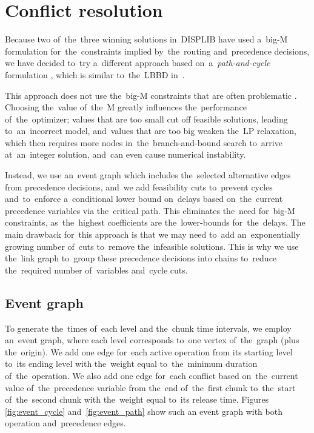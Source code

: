 \section{Conflict resolution}
Because two of~the~three winning solutions in~DISPLIB have used a~big-M formulation \cite{wolsey1998integer} for~the~constraints implied by~the~routing and~precedence decisions, we have decided to~try a~different approach based on~a~\emph{path-and-cycle} formulation \cite{lamorgese2019noncompact}\cite{lamorgese2015optimal}, which is similar to~the~LBBD in~\textcite{Dubach2025handling}.

This approach does not use the~big-M constraints that are often problematic \cite{pineda2019not}\cite{codato2006combinatorial}. Choosing the~value of~the~M greatly influences the~performance of~the~optimizer; values that are too small cut off feasible solutions, leading to~an~incorrect model, and~values that are too big weaken the~LP relaxation, which then requires more nodes in~the~branch-and-bound search to~arrive at~an~integer solution, and~can even cause numerical instability.

Instead, we use an~event graph which includes the~selected alternative edges from precedence decisions, and~we add feasibility cuts to~prevent cycles and~to~enforce a~conditional lower bound on~delays based on~the~current precedence variables via the~critical path. This eliminates the~need for~big-M constraints, as~the~highest coefficients are the~lower-bounds for~the~delays. The main drawback for~this approach is that we may need to~add an~exponentially growing number of~cuts to~remove the~infeasible solutions. This is why we use the~link graph to~group these precedence decisions into chains to~reduce the~required number of~variables and~cycle cuts.

\subsection{Event graph}
To generate the~times of~each level and the~chunk time intervals, we employ an~event graph, where each level corresponds to~one vertex of~the~graph (plus the~origin). We add one edge for~each active operation from its starting level to~its ending level with the~weight equal to~the~minimum duration of~the~operation. We also add one edge for~each conflict based on~the~current value of~the~precedence variable from the~end of~the~first chunk to~the~start of~the~second chunk with the~weight equal to~its release time. Figures \ref{fig:event_cycle} and~\ref{fig:event_path} show such an event graph with both operation and~precedence edges.

